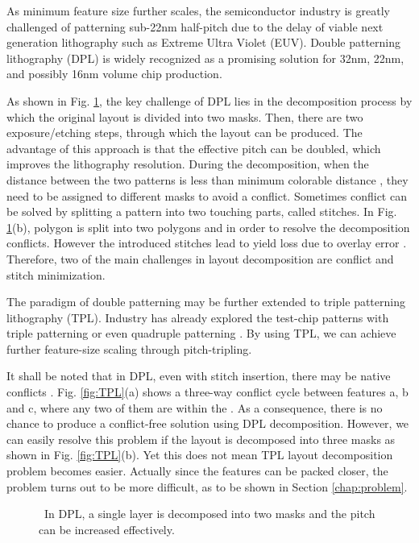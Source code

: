 \documentclass[10pt,conference]{IEEEtran}
\begin{document}
As minimum feature size further scales, the semiconductor industry is greatly challenged of patterning sub-22nm half-pitch due to the delay of viable next generation lithography such as Extreme Ultra Violet (EUV).
Double patterning lithography (DPL) is widely recognized as a promising solution for 32nm, 22nm, and possibly 16nm volume chip production.

As shown in Fig. \ref{fig:DPL}, the key challenge of DPL lies in the decomposition process by which the original layout is divided into two masks.
Then, there are two exposure/etching steps, through which the layout can be produced.
The advantage of this approach is that the effective pitch can be doubled, which improves the lithography resolution.
During the decomposition, when the distance between the two patterns is less than minimum colorable distance , they need to be assigned to different masks to avoid a conflict.
Sometimes conflict can be solved by splitting a pattern into two touching parts, called stitches.
In Fig. \ref{fig:DPL}(b), polygon  is split into two polygons  and  in order to resolve the decomposition conflicts.
However the introduced stitches lead to yield loss due to overlay error  \cite{DPL_ICCAD08_Yang}.
Therefore, two of the main challenges in layout decomposition are conflict and stitch minimization.

The paradigm of double patterning may be further extended to triple patterning lithography (TPL).
Industry has already explored the test-chip patterns with triple patterning or even quadruple patterning \cite{2009Intel}.
By using TPL, we can achieve further feature-size scaling through pitch-tripling.

It shall be noted that in DPL, even with stitch insertion, there may be native conflicts \cite{DPL_SPIE07_Anton}.
Fig. \ref{fig:TPL}(a) shows a three-way conflict cycle between features a, b and c, where any two of them are within the .
As a consequence, there is no chance to produce a conflict-free solution using DPL decomposition.
However, we can easily resolve this problem if the layout is decomposed into three masks as shown in Fig. \ref{fig:TPL}(b). 
Yet this does not mean TPL layout decomposition problem becomes easier. Actually since the features can be packed closer, the problem turns out to be more difficult, as to be shown in Section  \ref{chap:problem}.


\begin{figure}[bt]
    \centering
    \caption{~In DPL, a single layer is decomposed into two masks and the pitch can be increased effectively.}
    \label{fig:DPL}
\end{figure}
\end{document}
